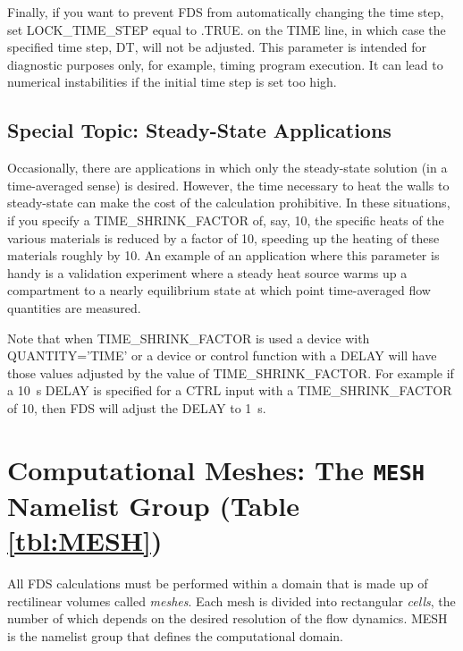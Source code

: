 \documentclass[11pt]{book}
\begin{document}
Finally, if you want to prevent FDS from automatically changing the time step, set {\ct LOCK\_TIME\_STEP} equal to {\ct .TRUE.}
on the {\ct TIME} line, in which case the specified
time step, {\ct DT}, will not be adjusted.
This parameter is intended for diagnostic purposes only, for example, timing program execution. It can lead to
numerical instabilities if the initial time step is set too high.



\subsection{Special Topic: Steady-State Applications}
\label{info:steady_state}

Occasionally, there are applications in which only the steady-state solution (in a time-averaged sense) is desired. However, the time necessary to
heat the walls to steady-state can make the cost of the calculation prohibitive. In these situations, if you specify a
{\ct TIME\_SHRINK\_FACTOR} of, say, 10, the specific heats of the various materials is reduced by a factor of 10, speeding up the heating
of these materials roughly by 10. An example of an application where this parameter is handy is a validation experiment where a steady heat source
warms up a compartment to a nearly equilibrium state at which point time-averaged flow quantities are measured.

Note that when {\ct TIME\_SHRINK\_FACTOR} is used a device with {\ct QUANTITY='TIME'} or a device or control function with a {\ct DELAY} will have those values adjusted by the value of {\ct TIME\_SHRINK\_FACTOR}.  For example if a 10~s {\ct DELAY} is specified for a {\ct CTRL} input with a {\ct TIME\_SHRINK\_FACTOR} of 10, then FDS will adjust the {\ct DELAY} to 1~s.

\newpage

\section{Computational Meshes: The \texorpdfstring{{\tt MESH}}{MESH} Namelist Group (Table \ref{tbl:MESH})}
\label{info:MESH}

All FDS calculations must be performed within a domain that is made up
of rectilinear volumes called {\em meshes}. Each mesh is divided into rectangular {\em cells},
the number of which depends on the desired resolution of the flow dynamics.
{\ct MESH} is the namelist group that defines the computational domain.
\end{document}
